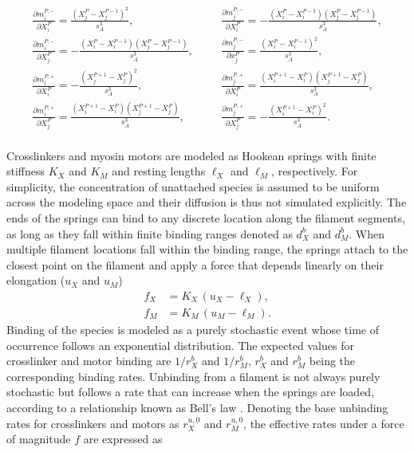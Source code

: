 \begin{equation}\label{eq:unitVecDerivative}
	\begin{aligned}
		\frac{ \partial m_i^{P,-}}{\partial X_i^P} = \frac{\left( X^P_j - X^{P-1}_j \right)^2}{s_A^3}, \;\;\;\;\;\; & \frac{ \partial m_j^{P,-}}{\partial X_i^P} = - \frac{\left( X^P_i - X^{P-1}_i \right)\left( X^P_j - X^{P-1}_j \right)}{s_A^3} ,\\
		\frac{ \partial m_i^{P,-}}{\partial X_j^P} = - \frac{\left( X^P_i - X^{P-1}_i \right)\left( X^P_j - X^{P-1}_j \right)}{s_A^3}, \;\;\;\;\;\; & \frac{ \partial m_j^{P,-}}{\partial x_j^P} = \frac{\left( X^P_i - X^{P-1}_i \right)^2}{s_A^3}, \\
		\frac{ \partial m_i^{P,+}}{\partial X_i^P} = - \frac{\left( X^{P+1}_j - X^{P}_j \right)^2}{s_A^3}, \;\;\;\;\;\; & \frac{ \partial m_j^{P,+}}{\partial X_i^P} = \frac{\left( X^{P+1}_i - X^{P}_i \right)\left( X^{P+1}_j - X^{P}_j \right)}{s_A^3} ,\\
		\frac{ \partial m_i^{P,+}}{\partial X_j^P} = \frac{\left( X^{P+1}_i - X^{P}_i \right)\left( X^{P+1}_j - X^{P}_j \right)}{s_A^3}, \;\;\;\;\;\; & \frac{ \partial m_j^{P,+}}{\partial X_j^P} = - \frac{\left( X^{P+1}_i - X^{P}_i \right)^2}{s_A^3} .\\
	\end{aligned}
\end{equation}


Crosslinkers and myosin motors are modeled as Hookean springs with finite stiffness $K_X$ and $K_M$ and resting lengths $\ell_X$ and $\ell_M$, respectively. For simplicity, the concentration of unattached species is assumed to be uniform across the modeling space and their diffusion is thus not simulated explicitly. The ends of the springs can bind to any discrete location along the filament segments, as long as they fall within finite binding ranges denoted as $d_X^b$ and $d_M^b$. When multiple filament locations fall within the binding range, the springs attach to the closest point on the filament and apply a force that depends linearly on their elongation ($u_X$ and $u_M$)
\begin{equation}\label{eq:forceSingles}
	\begin{aligned}
		f_X &= K_X \, (u_X - \ell_X)  ,\\
		f_M &= K_M \, (u_M - \ell_M) .
	\end{aligned}
\end{equation}
Binding of the species is modeled as a purely stochastic event whose time of occurrence follows an exponential distribution. The expected values for crosslinker and motor binding are $1/r_X^b$ and $1/r_M^b$, $r_X^b$ and $r_M^b$ being the corresponding binding rates.
Unbinding from a filament is not always purely stochastic but follows a rate that can increase when the springs are loaded, according to a relationship known as Bell's law \cite{Bell1978}. Denoting the base unbinding rates for crosslinkers and motors as $r_X^{u,0}$ and $r_M^{u,0}$, the effective rates under a force of magnitude $f$ are expressed as


